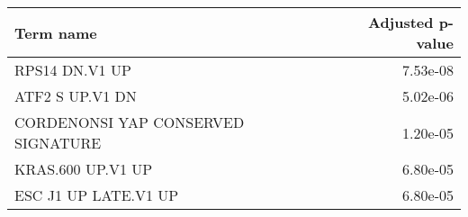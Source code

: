 \begin{tabular}{lr}
\toprule
                         Term name &  Adjusted p-value \\
\midrule
                    RPS14 DN.V1 UP &          7.53e-08 \\
                   ATF2 S UP.V1 DN &          5.02e-06 \\
CORDENONSI YAP CONSERVED SIGNATURE &          1.20e-05 \\
                 KRAS.600 UP.V1 UP &          6.80e-05 \\
              ESC J1 UP LATE.V1 UP &          6.80e-05 \\
\bottomrule
\end{tabular}
